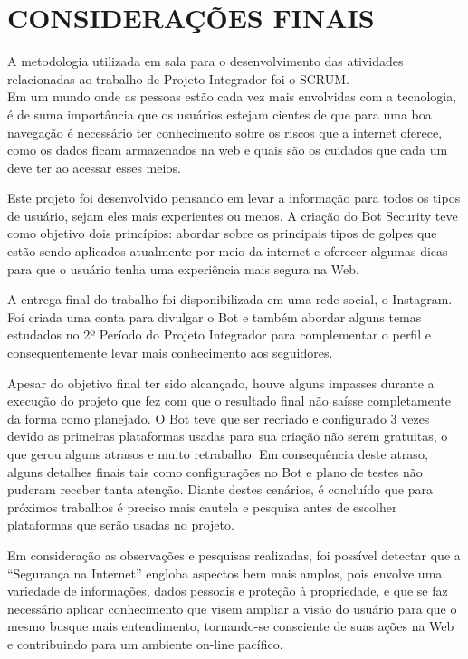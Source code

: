 \chapter{\uppercase{Considerações finais}}
\label{conclusao}

A metodologia utilizada em sala para o desenvolvimento das atividades relacionadas ao trabalho de Projeto Integrador foi o SCRUM. \cite{scrum}\\

Em um mundo onde as pessoas estão cada vez mais envolvidas com a tecnologia, é de suma importância que os usuários estejam cientes de que para uma boa navegação é necessário ter conhecimento sobre os riscos que a internet oferece, como os dados ficam armazenados na web e quais são os cuidados que cada um deve ter ao acessar esses meios.  \cite{cookies}

Este projeto foi desenvolvido pensando em levar a informação para todos os tipos de usuário, sejam eles mais experientes ou menos. A criação do Bot Security teve como objetivo dois princípios: abordar sobre os principais tipos de golpes que estão sendo aplicados atualmente por meio da internet e oferecer algumas dicas para que o usuário tenha uma experiência mais segura na Web.\cite{segint} 

A entrega final do trabalho foi disponibilizada em uma rede social, o Instagram. Foi criada uma conta para divulgar o Bot e também abordar alguns temas estudados no 2º Período do Projeto Integrador para complementar o perfil e consequentemente levar mais conhecimento aos seguidores.

Apesar do objetivo final ter sido alcançado, houve alguns impasses durante a execução do projeto que fez com que o resultado final não saísse completamente da forma como planejado. O Bot teve que ser recriado e configurado 3 vezes devido as primeiras plataformas usadas para sua criação não serem gratuitas, o que gerou alguns atrasos e muito retrabalho. Em consequência deste atraso, alguns detalhes finais tais como configurações no Bot e plano de testes não puderam receber tanta atenção. Diante destes cenários, é concluído que para próximos trabalhos é preciso mais cautela e pesquisa antes de escolher plataformas que serão usadas no projeto. 

Em consideração as observações e pesquisas realizadas, foi possível detectar que a “Segurança na Internet” engloba aspectos bem mais amplos, pois envolve uma variedade de informações, dados pessoais e proteção à propriedade, e que se faz necessário aplicar conhecimento que visem ampliar a visão do usuário para que o mesmo busque mais entendimento, tornando-se consciente de suas ações na Web e contribuindo para um ambiente on-line pacífico.



